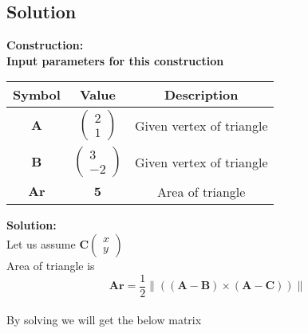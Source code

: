 \documentclass[10pt,a4paper]{report}
\newcommand{\myvec}[1]{\ensuremath{\begin{pmatrix}#1\end{pmatrix}}}
\providecommand{\norm}[1]{\left\lVert#1\right\rVert}
\let\vec\mathbf
\begin{document}
\begin{multicols}{2}
\section*{Solution}
\textbf{Construction: }\\
\textbf{Input parameters for this construction}
\begin{center}
\begin{tabular}{|c|c|c|}
\hline
\textbf{Symbol}&{Value}&{Description}\\
\hline
$\vec{A}$&$\myvec{2 \\ 1}$&Given vertex of triangle\\
\hline
$\vec{B}$&$\myvec{3 \\ -2}$&Given vertex of triangle\\
\hline
$\vec{Ar}$&$\vec{5}$&Area of triangle\\
\hline
\end{tabular}
\end{center}
\textbf{  Solution:}\\
Let us assume $\vec{C}\myvec{x \\ y}$\\
\vspace{0.25cm}
Area of triangle is \\
 \begin{equation}
\vec{Ar}=\frac{1}{2}\norm{(\vec{(A-B)}\times\vec{(A-C)})}
\end{equation}
\\   %
By solving we will get the below matrix \\
		  

\end{multicols}
\end{document}
